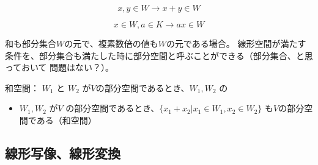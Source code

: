 \documentclass[10pt,a4paper,uplatex]{jsarticle}
\begin{document}
\begin{equation}
x,y \in W \to x+y \in W
\end{equation}

\begin{equation}
x \in W, a\in K \to ax\in W
\end{equation}

和も部分集合$W$の元で、複素数倍の値も$W$の元である場合。 
線形空間が満たす条件を、部分集合も満たした時に部分空間と呼ぶことができる（部分集合、と思っておいて
問題はない？）。

和空間：
$W_1$ と $W_2$ が$V$の部分空間であるとき、$W_1,W_2$ の

\begin{itemize}
	\item $W_1,W_2$ が$V$ の部分空間であるとき、$\{x_1+x_2|x_1\in W_1, x_2\in W_2\}$ も$V$の部分空間である（和空間）
\end{itemize}

\subsection{線形写像、線形変換}
\end{document}
